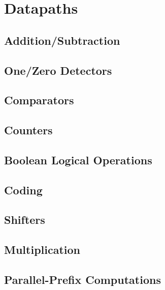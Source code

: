 \section{Datapaths}

\subsection{Addition/Subtraction}

\subsection{One/Zero Detectors}

\subsection{Comparators}

\subsection{Counters}

\subsection{Boolean Logical Operations}

\subsection{Coding}

\subsection{Shifters}

\subsection{Multiplication}

\subsection{Parallel-Prefix Computations}

